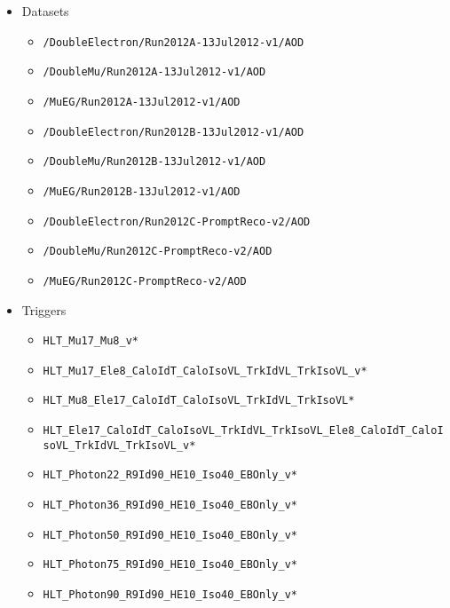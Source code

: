 \begin{itemize}
\item Datasets
  \begin{itemize}
  \item \verb=/DoubleElectron/Run2012A-13Jul2012-v1/AOD=
  \item \verb=/DoubleMu/Run2012A-13Jul2012-v1/AOD=
  \item \verb=/MuEG/Run2012A-13Jul2012-v1/AOD=
  \item \verb=/DoubleElectron/Run2012B-13Jul2012-v1/AOD=
  \item \verb=/DoubleMu/Run2012B-13Jul2012-v1/AOD=
  \item \verb=/MuEG/Run2012B-13Jul2012-v1/AOD=
  \item \verb=/DoubleElectron/Run2012C-PromptReco-v2/AOD=         
  \item \verb=/DoubleMu/Run2012C-PromptReco-v2/AOD=         
  \item \verb=/MuEG/Run2012C-PromptReco-v2/AOD=         
  \end{itemize}

\item Triggers
  \begin{itemize}
    \item \verb=HLT_Mu17_Mu8_v*=
    \item \verb=HLT_Mu17_Ele8_CaloIdT_CaloIsoVL_TrkIdVL_TrkIsoVL_v*=
    \item \verb=HLT_Mu8_Ele17_CaloIdT_CaloIsoVL_TrkIdVL_TrkIsoVL*=
    \item {\footnotesize \verb=HLT_Ele17_CaloIdT_CaloIsoVL_TrkIdVL_TrkIsoVL_Ele8_CaloIdT_CaloIsoVL_TrkIdVL_TrkIsoVL_v*=}
    \item \verb=HLT_Photon22_R9Id90_HE10_Iso40_EBOnly_v*=
    \item \verb=HLT_Photon36_R9Id90_HE10_Iso40_EBOnly_v*=
    \item \verb=HLT_Photon50_R9Id90_HE10_Iso40_EBOnly_v*=
    \item \verb=HLT_Photon75_R9Id90_HE10_Iso40_EBOnly_v*=
    \item \verb=HLT_Photon90_R9Id90_HE10_Iso40_EBOnly_v*=
  \end{itemize}
\end{itemize}
  
